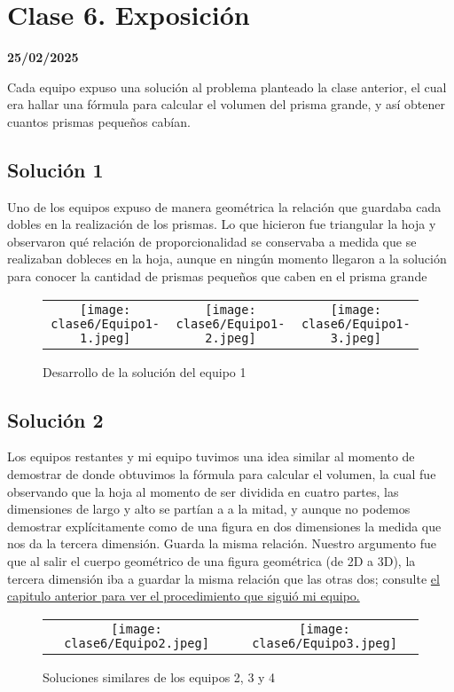 \chapter{Clase 6. Exposición}
\textbf{25/02/2025}

Cada equipo expuso una solución al problema planteado la clase anterior, el cual era hallar una fórmula para calcular el volumen del prisma grande, y así obtener cuantos prismas pequeños cabían.

\section{Solución 1}
Uno de los equipos expuso de manera geométrica la relación que guardaba cada dobles en la realización de los prismas. Lo que hicieron fue triangular la hoja y observaron qué relación de proporcionalidad se conservaba a medida que se realizaban dobleces en la hoja, aunque en ningún momento llegaron a la solución para conocer la cantidad de prismas pequeños que caben en el prisma grande

\begin{center}
    \begin{figure}[H]
        \begin{tabular}{ccc}    
            \texttt{[image: clase6/Equipo1-1.jpeg]}&\texttt{[image: clase6/Equipo1-2.jpeg]}&\texttt{[image: clase6/Equipo1-3.jpeg]}
        \end{tabular}
        \caption{Desarrollo de la solución del equipo 1}
    \end{figure}
\end{center}

\section{Solución 2}

Los equipos restantes y mi equipo tuvimos una idea similar al momento de demostrar de donde obtuvimos la fórmula para calcular el volumen, la cual fue observando que la hoja al momento de ser dividida en cuatro partes, las dimensiones de largo y alto se partían a a la mitad, y aunque no podemos demostrar explícitamente como de una figura en dos dimensiones la medida que nos da la tercera dimensión. Guarda la misma relación. Nuestro argumento fue que al salir el cuerpo geométrico de una figura geométrica (de 2D a 3D), la tercera dimensión iba a guardar la misma relación que las otras dos; consulte \hyperref[chap:C5]{el capitulo anterior para ver el procedimiento que siguió mi equipo.}

\begin{figure}[H]
    \centering %
    \begin{tabular}{cc}
        \texttt{[image: clase6/Equipo2.jpeg]}&\texttt{[image: clase6/Equipo3.jpeg]}
    \end{tabular}
    \caption{Soluciones similares de los equipos 2, 3 y 4}
\end{figure}